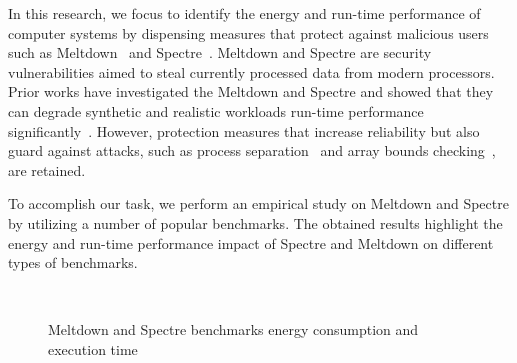 \documentclass[sigconf, screen]{acmart}
\begin{document}
In this research, we focus to identify the energy and run-time performance
of computer systems by dispensing measures that protect against malicious users
such as Meltdown~\cite{meltdown_2018} and Spectre~\cite{spectre_2019}.
Meltdown and Spectre are security vulnerabilities aimed to steal currently processed
data from modern processors.
Prior works have investigated the Meltdown and Spectre and showed that they can degrade
synthetic and realistic workloads run-time performance
significantly~\cite{spectre_performance_2018, SIJMWGDFT_2018, spectre_meltdown_impact}.
However, protection measures that increase reliability but also guard against 
attacks, such as process separation~\cite{PFH_2003} and array bounds checking~\cite{ACCH_2009},
are retained.

To accomplish our task, we perform an empirical study on
Meltdown and Spectre by utilizing a number of popular benchmarks.
The obtained results highlight the energy and run-time performance impact
of Spectre and Meltdown on different types of benchmarks.

\begin{figure}
	 \\
	\caption{Meltdown and Spectre benchmarks energy consumption and execution time}
	\label{fig:energy_run_time_performance_results}
\end{figure}
\end{document}
